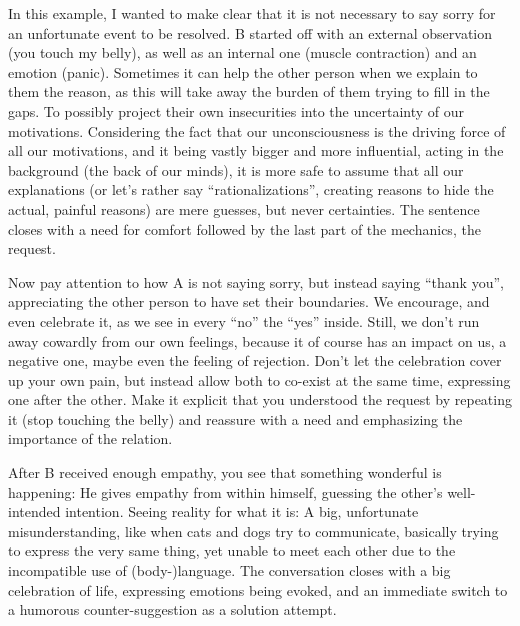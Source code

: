 In this example, I wanted to make clear that it is not necessary to say sorry for an unfortunate event to be resolved.
B started off with an external observation (you touch my belly), as well as an internal one (muscle contraction) and an emotion (panic).
Sometimes it can help the other person when we explain to them the reason, as this will take away the burden of them trying to fill in the gaps.
To possibly project their own insecurities into the uncertainty of our motivations.
Considering the fact that our unconsciousness is the driving force of all our motivations, and it being vastly bigger and more influential, acting in the background (the back of our minds), it is more safe to assume that all our explanations (or let's rather say ``rationalizations'', creating reasons to hide the actual, painful reasons) are mere guesses, but never certainties.
The sentence closes with a need for comfort followed by the last part of the mechanics, the request.


Now pay attention to how A is not saying sorry, but instead saying ``thank you'', appreciating the other person to have set their boundaries.
We encourage, and even celebrate it, as we see in every ``no'' the ``yes'' inside.
Still, we don't run away cowardly from our own feelings, because it of course has an impact on us, a negative one, maybe even the feeling of rejection.
Don't let the celebration cover up your own pain, but instead allow both to co-exist at the same time, expressing one after the other.
Make it explicit that you understood the request by repeating it (stop touching the belly) and reassure with a need and emphasizing the importance of the relation.

After B received enough empathy, you see that something wonderful is happening: He gives empathy from within himself, guessing the other's well-intended intention.
Seeing reality for what it is: A big, unfortunate misunderstanding, like when cats and dogs try to communicate, basically trying to express the very same thing, yet unable to meet each other due to the incompatible use of (body-)language.
The conversation closes with a big celebration of life, expressing emotions being evoked, and an immediate switch to a humorous counter-suggestion as a solution attempt.

